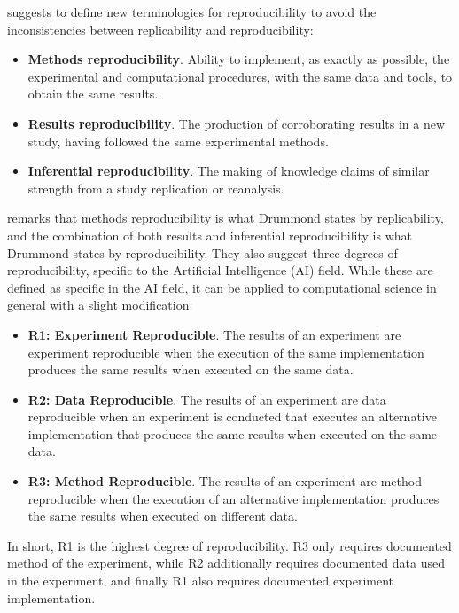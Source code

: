\citet{goodmanWhatDoesResearch2016} suggests to define new terminologies for reproducibility to avoid the inconsistencies between replicability and reproducibility:
\begin{itemize}
	\item \textbf{Methods reproducibility}. Ability to implement, as exactly as possible, the experimental and computational procedures, with the same data and tools, to obtain the same results.

	\item \textbf{Results reproducibility}. The production of corroborating results in a new study, having followed the same experimental methods.

	\item \textbf{Inferential reproducibility}. The making of knowledge claims of similar strength from a study replication or reanalysis.
\end{itemize}

\citet{gundersenStateArtReproducibility2018} remarks that methods reproducibility is what Drummond states by replicability, and the combination of both results and inferential reproducibility is what Drummond states by reproducibility.
They also suggest three degrees of reproducibility, specific to the Artificial Intelligence (AI) field.
While these are defined as specific in the AI field, it can be applied to computational science in general with a slight modification:
\begin{itemize}
	\item \textbf{R1: Experiment Reproducible}. The results of an experiment are experiment reproducible when the execution of the same implementation produces the same results when executed on the same data.
	\item \textbf{R2: Data Reproducible}. The results of an experiment are data reproducible when an experiment is conducted that executes an alternative implementation that produces the same results when executed on the same data.
	\item \textbf{R3: Method Reproducible}. The results of an experiment are method reproducible when the execution of an alternative implementation produces the same results when executed on different data.
\end{itemize}

In short, R1 is the highest degree of reproducibility.
R3 only requires documented method of the experiment, while R2 additionally requires documented data used in the experiment, and finally R1 also requires documented experiment implementation.

